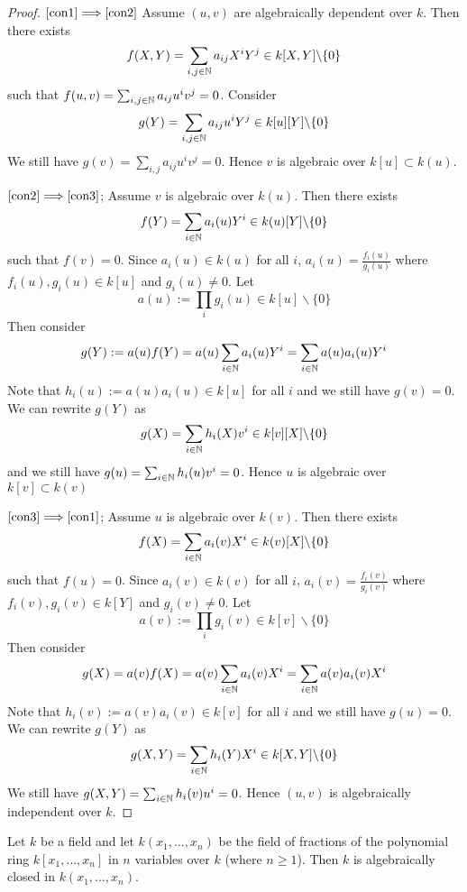 \begin{proof}
	$\eqref{con1}  \Longrightarrow \eqref{con2} $ Assume $(u,v)$ 
	are algebraically dependent over $k$. Then there 
	exists $$ f(X,Y) = \sum_{i,j \in \mathbb{N}} a_{ij} X^iY^j \in 
	k[X,Y] \backslash \lbrace 0 \rbrace $$ such that
	$f(u,v) = \sum_{i,j \in \mathbb{N}} a_{ij} u^iv^j = 0 $. 
	Consider $$g(Y) = \sum_{i,j \in \mathbb{N}} a_{ij} u^iY^j 
	\in k[u][Y] \backslash \lbrace 0 \rbrace $$ We still 
	have $g(v) = \sum_{i,j} a_{ij} u^iv^j = 0 $. 
	Hence $v$ is algebraic over $k[u] \subset k(u)$. 


	$\eqref{con2} \Longrightarrow \eqref{con3} $; Assume $v$ is 
	algebraic over $k(u)$. Then there exists
	$$ f(Y) = \sum_{i\in \mathbb{N}} a_i(u)Y^i \in k(u)[Y] \backslash \lbrace 0 \rbrace $$ 
	such that $f(v) = 0$. Since $a_i(u) \in k(u)$ for 
	all $i$, $a_i(u) = \frac{f_i(u)}{g_i(u)} $ 
	where $f_i(u),g_i(u) \in k[u]$ and $g_i(u) \neq 0 $. 
	Let $$a(u) := \prod_i g_i(u) \in k[u] \backslash \lbrace 0 \rbrace $$ 
	Then consider $$ g(Y) := a(u)f(Y) = a(u)\sum_{i\in \mathbb{N}}
	a_i(u)Y^i = \sum_{i \in \mathbb{N}}a(u) a_i(u)Y^i $$ 
	Note that $h_i(u):=a(u)a_i(u) \in k[u] $ for all $i$ 
	and we still have $g(v) = 0 $. We can rewrite $g(Y)$ 
	as $$ g(X) = \sum_{i \in \mathbb{N}} h_i(X)v^i \in k[v][X] \backslash \lbrace 0 \rbrace $$ 
	and we still have  $g(u) = \sum_{i \in \mathbb{N}} h_i(u) v^i = 0 $. 
	Hence $u$ is algebraic over $k[v] \subset k(v)$ 

	$\eqref{con3} \Longrightarrow \eqref{con1}$; 
	Assume $u$ is algebraic over $k(v)$. Then there 
	exists $$ f(X) = \sum_{i \in \mathbb{N} } a_i(v)X^i \in k(v)[X] 
	\backslash \lbrace 0 \rbrace $$ such that $f(u) = 0$. 
	Since $a_i(v) \in k(v) $ for all $i$, $a_i(v)= \frac{f_i(v)}{g_i(v)}$ 
	where $f_i(v),g_i(v) \in k[Y]$ and $g_i(v) \neq 0 $. 
	Let $$a(v) := \prod_i g_i(v) \in k[v] \backslash \lbrace 0 \rbrace  $$ 
	Then consider $$ g(X) = a(v)f(X) = a(v)\sum_{i \in \mathbb{N}} a_i(v)X^i 
	= \sum_{i \in \mathbb{N}} a(v)a_i(v)X^i $$ Note that
	$h_i(v):=a(v)a_i(v) \in k[v] $ for all $i$ and we still 
	have $g(u) = 0 $. We can rewrite $g(Y)$ as
	$$ g(X,Y) = \sum_{i \in \mathbb{N}} h_i(Y)X^i \in k[X,Y] 
	\backslash \lbrace 0 \rbrace  $$ We still have
	$g(X,Y) = \sum_{i \in \mathbb{N}} h_i(v) u^i = 0 $. 
	Hence $(u,v)$ is algebraically independent over $k$.
\end{proof}

\begin{lemma} \label {z0cb9182wbxi81f6}
	Let $k$ be a field and let $k(x_1, \dots, x_n)$ be 
	the field of fractions of the
	polynomial ring  $k[x_1, \dots, x_n]$ in $n$ variables 
	over $k$ (where $n \ge 1$).
	Then $k$ is algebraically closed in $k(x_1, \dots, x_n)$.
\end{lemma}

